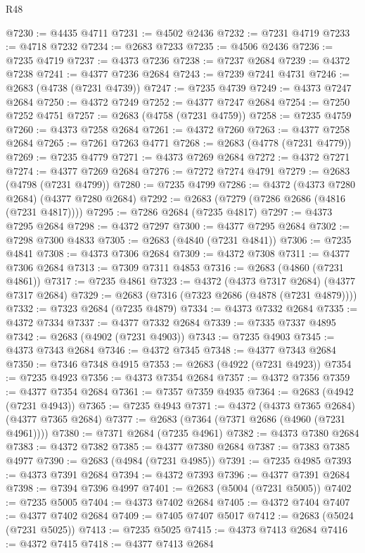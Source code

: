 \begin{lexlean}{R48}
\begin{coremodule}
@7230 := @4435 @4711
@7231 := @4502 @2436
@7232 := @7231 @4719
@7233 := @4718 @7232
@7234 := @2683 @7233
@7235 := @4506 @2436
@7236 := @7235 @4719
@7237 := @4373 @7236
@7238 := @7237 @2684
@7239 := @4372 @7238
@7241 := @4377 @7236 @2684
@7243 := @7239 @7241 @4731
@7246 := @2683 (@4738 (@7231 @4739))
@7247 := @7235 @4739
@7249 := @4373 @7247 @2684
@7250 := @4372 @7249
@7252 := @4377 @7247 @2684
@7254 := @7250 @7252 @4751
@7257 := @2683 (@4758 (@7231 @4759))
@7258 := @7235 @4759
@7260 := @4373 @7258 @2684
@7261 := @4372 @7260
@7263 := @4377 @7258 @2684
@7265 := @7261 @7263 @4771
@7268 := @2683 (@4778 (@7231 @4779))
@7269 := @7235 @4779
@7271 := @4373 @7269 @2684
@7272 := @4372 @7271
@7274 := @4377 @7269 @2684
@7276 := @7272 @7274 @4791
@7279 := @2683 (@4798 (@7231 @4799))
@7280 := @7235 @4799
@7286 := @4372 (@4373 @7280 @2684) (@4377 @7280 @2684)
@7292 := @2683 (@7279 (@7286 @2686 (@4816 (@7231 @4817))))
@7295 := @7286 @2684 (@7235 @4817)
@7297 := @4373 @7295 @2684
@7298 := @4372 @7297
@7300 := @4377 @7295 @2684
@7302 := @7298 @7300 @4833
@7305 := @2683 (@4840 (@7231 @4841))
@7306 := @7235 @4841
@7308 := @4373 @7306 @2684
@7309 := @4372 @7308
@7311 := @4377 @7306 @2684
@7313 := @7309 @7311 @4853
@7316 := @2683 (@4860 (@7231 @4861))
@7317 := @7235 @4861
@7323 := @4372 (@4373 @7317 @2684) (@4377 @7317 @2684)
@7329 := @2683 (@7316 (@7323 @2686 (@4878 (@7231 @4879))))
@7332 := @7323 @2684 (@7235 @4879)
@7334 := @4373 @7332 @2684
@7335 := @4372 @7334
@7337 := @4377 @7332 @2684
@7339 := @7335 @7337 @4895
@7342 := @2683 (@4902 (@7231 @4903))
@7343 := @7235 @4903
@7345 := @4373 @7343 @2684
@7346 := @4372 @7345
@7348 := @4377 @7343 @2684
@7350 := @7346 @7348 @4915
@7353 := @2683 (@4922 (@7231 @4923))
@7354 := @7235 @4923
@7356 := @4373 @7354 @2684
@7357 := @4372 @7356
@7359 := @4377 @7354 @2684
@7361 := @7357 @7359 @4935
@7364 := @2683 (@4942 (@7231 @4943))
@7365 := @7235 @4943
@7371 := @4372 (@4373 @7365 @2684) (@4377 @7365 @2684)
@7377 := @2683 (@7364 (@7371 @2686 (@4960 (@7231 @4961))))
@7380 := @7371 @2684 (@7235 @4961)
@7382 := @4373 @7380 @2684
@7383 := @4372 @7382
@7385 := @4377 @7380 @2684
@7387 := @7383 @7385 @4977
@7390 := @2683 (@4984 (@7231 @4985))
@7391 := @7235 @4985
@7393 := @4373 @7391 @2684
@7394 := @4372 @7393
@7396 := @4377 @7391 @2684
@7398 := @7394 @7396 @4997
@7401 := @2683 (@5004 (@7231 @5005))
@7402 := @7235 @5005
@7404 := @4373 @7402 @2684
@7405 := @4372 @7404
@7407 := @4377 @7402 @2684
@7409 := @7405 @7407 @5017
@7412 := @2683 (@5024 (@7231 @5025))
@7413 := @7235 @5025
@7415 := @4373 @7413 @2684
@7416 := @4372 @7415
@7418 := @4377 @7413 @2684

\end{coremodule}
\end{lexlean}
